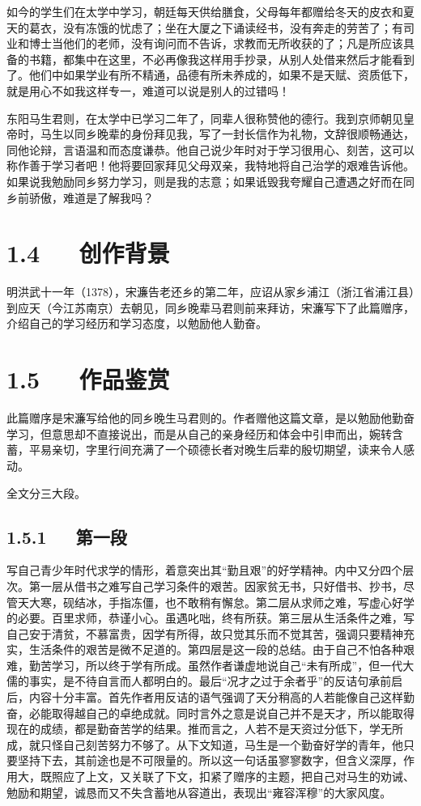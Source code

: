 \documentclass[letterpaper,10pt,english]{sphinxmanual}
\begin{document}
如今的学生们在太学中学习，朝廷每天供给膳食，父母每年都赠给冬天的皮衣和夏天的葛衣，没有冻饿的忧虑了；坐在大厦之下诵读经书，没有奔走的劳苦了；有司业和博士当他们的老师，没有询问而不告诉，求教而无所收获的了；凡是所应该具备的书籍，都集中在这里，不必再像我这样用手抄录，从别人处借来然后才能看到了。他们中如果学业有所不精通，品德有所未养成的，如果不是天赋、资质低下，就是用心不如我这样专一，难道可以说是别人的过错吗！

东阳马生君则，在太学中已学习二年了，同辈人很称赞他的德行。我到京师朝见皇帝时，马生以同乡晚辈的身份拜见我，写了一封长信作为礼物，文辞很顺畅通达，同他论辩，言语温和而态度谦恭。他自己说少年时对于学习很用心、刻苦，这可以称作善于学习者吧！他将要回家拜见父母双亲，我特地将自己治学的艰难告诉他。如果说我勉励同乡努力学习，则是我的志意；如果诋毁我夸耀自己遭遇之好而在同乡前骄傲，难道是了解我吗？


\section{1.4   创作背景}
\label{\detokenize{p01_u6563_u6587/_u5b8b_u6fc2-_u9001_u4e1c_u9633_u9a6c_u751f_u5e8f:id6}}
明洪武十一年（1378），宋濂告老还乡的第二年，应诏从家乡浦江（浙江省浦江县）到应天（今江苏南京）去朝见，同乡晚辈马君则前来拜访，宋濂写下了此篇赠序，介绍自己的学习经历和学习态度，以勉励他人勤奋。


\section{1.5   作品鉴赏}
\label{\detokenize{p01_u6563_u6587/_u5b8b_u6fc2-_u9001_u4e1c_u9633_u9a6c_u751f_u5e8f:id7}}
此篇赠序是宋濂写给他的同乡晚生马君则的。作者赠他这篇文章，是以勉励他勤奋学习，但意思却不直接说出，而是从自己的亲身经历和体会中引申而出，婉转含蓄，平易亲切，字里行间充满了一个硕德长者对晚生后辈的殷切期望，读来令人感动。

全文分三大段。


\subsection{1.5.1   第一段}
\label{\detokenize{p01_u6563_u6587/_u5b8b_u6fc2-_u9001_u4e1c_u9633_u9a6c_u751f_u5e8f:id8}}
写自己青少年时代求学的情形，着意突出其“勤且艰”的好学精神。内中又分四个层次。第一层从借书之难写自己学习条件的艰苦。因家贫无书，只好借书、抄书，尽管天大寒，砚结冰，手指冻僵，也不敢稍有懈怠。第二层从求师之难，写虚心好学的必要。百里求师，恭谨小心。虽遇叱咄，终有所获。第三层从生活条件之难，写自己安于清贫，不慕富贵，因学有所得，故只觉其乐而不觉其苦，强调只要精神充实，生活条件的艰苦是微不足道的。第四层是这一段的总结。由于自己不怕各种艰难，勤苦学习，所以终于学有所成。虽然作者谦虚地说自己“未有所成”，但一代大儒的事实，是不待自言而人都明白的。最后“况才之过于余者乎”的反诘句承前启后，内容十分丰富。首先作者用反诘的语气强调了天分稍高的人若能像自己这样勤奋，必能取得越自己的卓绝成就。同时言外之意是说自己并不是天才，所以能取得现在的成绩，都是勤奋苦学的结果。推而言之，人若不是天资过分低下，学无所成，就只怪自己刻苦努力不够了。从下文知道，马生是一个勤奋好学的青年，他只要坚持下去，其前途也是不可限量的。所以这一句话虽寥寥数字，但含义深厚，作用大，既照应了上文，又关联了下文，扣紧了赠序的主题，把自己对马生的劝诫、勉励和期望，诚恳而又不失含蓄地从容道出，表现出“雍容浑穆”的大家风度。
\end{document}

